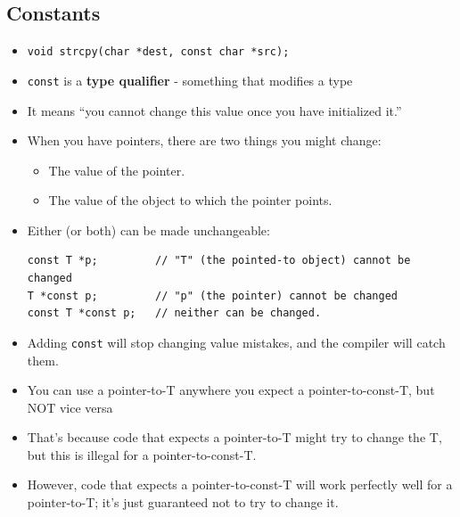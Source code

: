 \subsection{Constants}
\begin{itemize}
	\item \lstinline[style=C++]{void strcpy(char *dest, const char *src);}
	\item \lstinline[style=C++]{const} is a \textbf{type qualifier} - something that modifies a type
	\item It means ``you cannot change this value once you have initialized it.''
	\item When you have pointers, there are two things you might change:
	\begin{itemize}
		\item The value of the pointer.
		\item The value of the object to which the pointer points.
	\end{itemize}
	\item Either (or both) can be made unchangeable:
\begin{lstlisting}[style=C++]
const T *p;			// "T" (the pointed-to object) cannot be changed
T *const p;			// "p" (the pointer) cannot be changed
const T *const p;	// neither can be changed.
\end{lstlisting}
	\item Adding \lstinline[style=C++]{const} will stop changing value mistakes, and the compiler will catch them.
	\item You can use a pointer-to-T anywhere you expect a pointer-to-const-T, but NOT vice versa
	\item That's because code that expects a pointer-to-T might try to change the T, but this is illegal for a pointer-to-const-T.
	\item However, code that expects a pointer-to-const-T will work perfectly well for a pointer-to-T; it's just guaranteed not to try to change it.
\end{itemize}

